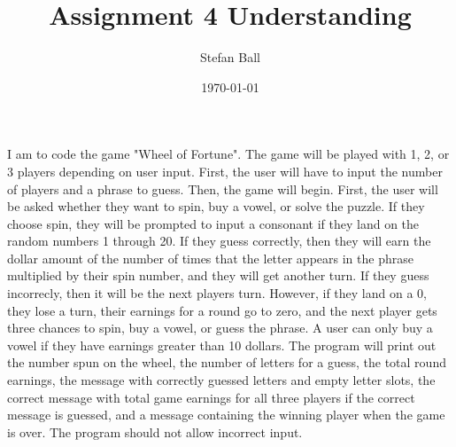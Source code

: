 \documentclass{article}
\title{Assignment 4 Understanding}
\author{Stefan Ball}
\date{\today}
\begin{document}
\maketitle



I am to code the game "Wheel of Fortune". The game will be played with 1, 2, or 3 players depending on user input. First, the user will have to input the number of players and a phrase to guess. Then, the game will begin. First, the user will be asked whether they want to spin, buy a vowel, or solve the puzzle. If they choose spin, they will be prompted to input a consonant if they land on the random numbers 1 through 20. If they guess correctly, then they will earn the dollar amount of the number of times that the letter appears in the phrase multiplied by their spin number, and they will get another turn. If they guess incorrecly, then it will be the next players turn. However, if they land on a 0, they lose a turn, their earnings for a round go to zero, and the next player gets three chances to spin, buy a vowel, or guess the phrase. A user can only buy a vowel if they have earnings greater than 10 dollars. The program will print out the number spun on the wheel, the number of letters for a guess, the total round earnings, the message with correctly guessed letters and empty letter slots, the correct message with total game earnings for all three players if the correct message is guessed, and a message containing the winning player when the game is over. The program should not allow incorrect input.



\end{document}
